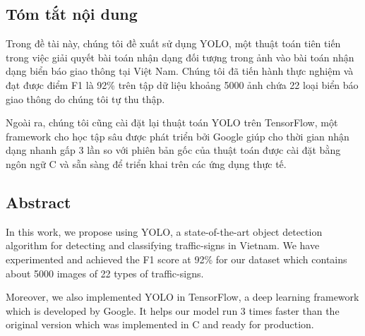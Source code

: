 \documentclass[../thesis.tex]{subfiles}
\begin{document}
\begin{centering}
	\section*{Tóm tắt nội dung}
\end{centering}

Trong đề tài này, chúng tôi đề xuất sử dụng YOLO, một thuật toán tiên tiến trong việc giải quyết bài toán nhận dạng đối tượng trong ảnh vào bài toán nhận dạng biển báo giao thông tại Việt Nam. Chúng tôi đã tiến hành thực nghiệm và đạt được điểm F1 là 92\% trên tập dữ liệu khoảng 5000 ảnh chứa 22 loại biển báo giao thông do chúng tôi tự thu thập. 

Ngoài ra, chúng tôi cũng cài đặt lại thuật toán YOLO trên TensorFlow, một framework cho học tập sâu được phát triển bởi Google giúp cho thời gian nhận dạng nhanh gấp 3 lần so với phiên bản gốc của thuật toán được cài đặt bằng ngôn ngữ C và sẵn sàng để triển khai trên các ứng dụng thực tế.

\begin{centering}
	\section*{Abstract}
\end{centering}

In this work, we propose using YOLO, a state-of-the-art object detection algorithm for detecting and classifying traffic-signs in Vietnam. We have experimented and achieved the F1 score at 92\% for our dataset which contains about 5000 images of 22 types of traffic-signs.

Moreover, we also implemented YOLO in TensorFlow, a deep learning framework which is developed by Google. It helps our model run 3 times faster than the original version which was implemented in C and ready for production.
\end{document}
